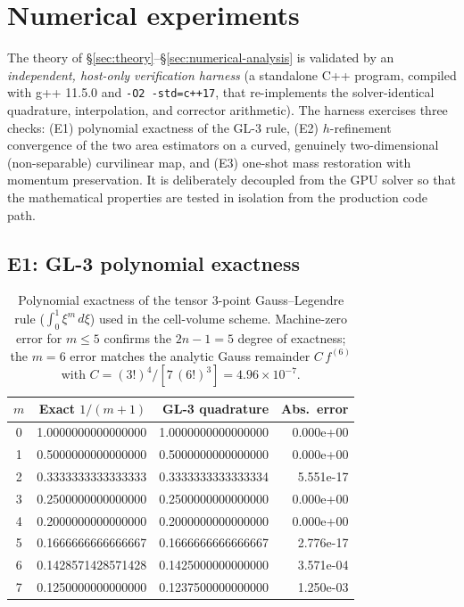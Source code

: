 \documentclass[11pt]{article}
\theoremstyle{definition}
\theoremstyle{remark}
\begin{document}
\section{Numerical experiments}
\label{sec:experiments}

The theory of \S\ref{sec:theory}--\S\ref{sec:numerical-analysis} is validated by
an \emph{independent, host-only verification harness} (a standalone C++ program,
compiled with g++ 11.5.0 and \texttt{-O2 -std=c++17}, that re-implements the
solver-identical quadrature, interpolation, and corrector arithmetic). The harness
exercises three checks: (E1) polynomial exactness of the GL-3 rule, (E2)
$h$-refinement convergence of the two area estimators on a curved, genuinely
two-dimensional (non-separable) curvilinear map, and (E3) one-shot mass
restoration with momentum preservation. It
is deliberately decoupled from the GPU solver so that the mathematical properties
are tested in isolation from the production code path.

\subsection{E1: GL-3 polynomial exactness}

\begin{table}[t]
\centering
\caption{Polynomial exactness of the tensor 3-point Gauss--Legendre rule
($\int_0^1\xi^m\,d\xi$) used in the cell-volume scheme. Machine-zero error for
$m\le5$ confirms the $2n-1=5$ degree of exactness; the $m=6$ error matches the
analytic Gauss remainder $C\,f^{(6)}$ with $C=(3!)^4/[7\,(6!)^3]=4.96\times10^{-7}$.}
\label{tab:gl3_exactness}
\begin{tabular}{c r r r}
\toprule
$m$ & {Exact $1/(m{+}1)$} & {GL-3 quadrature} & {Abs.\ error} \\
\midrule
0 & 1.0000000000000000 & 1.0000000000000000 & 0.000e+00 \\
1 & 0.5000000000000000 & 0.5000000000000000 & 0.000e+00 \\
2 & 0.3333333333333333 & 0.3333333333333334 & 5.551e-17 \\
3 & 0.2500000000000000 & 0.2500000000000000 & 0.000e+00 \\
4 & 0.2000000000000000 & 0.2000000000000000 & 0.000e+00 \\
5 & 0.1666666666666667 & 0.1666666666666667 & 2.776e-17 \\
6 & 0.1428571428571428 & 0.1425000000000000 & 3.571e-04 \\
7 & 0.1250000000000000 & 0.1237500000000000 & 1.250e-03 \\
\bottomrule
\end{tabular}
\end{table}
\end{document}
